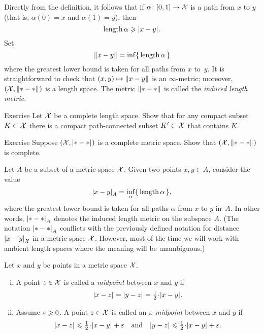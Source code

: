 Directly from the definition, it follows that if $\alpha\colon[0,1]\to\mathcal{X}$ is a path from $x$ to $y$ 
(that is, $\alpha(0)=x$ and $\alpha(1)=y$), then 
\[\length\alpha\ge \dist{x}{y}{}.\]
Set 
\[\yetdist{x}{y}{}=\inf\{\,\length\alpha\,\}\]
where the greatest lower bound is taken for all paths from $x$ to~$y$.
It is straightforward to check that $(x,y)\mapsto \yetdist{x}{y}{}$ is an $\infty$-metric; moreover, $(\spc{X},\yetdist{*}{*}{})$ is a length space.
The metric $\yetdist{*}{*}{}$ is called the \emph{induced length metric}.

\begin{thm}{Exercise}\label{ex:compact+connceted}
Let $\mathcal{X}$ be a complete length space.
Show that for any compact subset $K\subset\mathcal{X}$
there is a compact path-connected subset $K'\subset\mathcal{X}$ that contains $K$.  
\end{thm}

\begin{thm}{Exercise}\label{ex:compact=>complete}
Suppose $(\spc{X},\dist{*}{*}{})$ is a complete metric space.
Show that $(\spc{X},\yetdist{*}{*}{})$ is complete.
\end{thm}

Let $A$ be a subset of a metric space $\mathcal{X}$.
Given two points $x,y\in A$,
consider the value
\[\dist{x}{y}{A}=\inf_{\alpha}\{\,\length\alpha\,\},\]
where the greatest lower bound is taken for all paths $\alpha$ from $x$ to $y$ in~$A$.
In other words, $\dist{*}{*}{A}$ denotes the induced length metric on the subspace $A$.
(The notation $\dist{*}{*}{A}$ conflicts with the previously defined notation for distance $\dist{x}{y}{\spc{X}}$ in a metric space $\mathcal{X}$.
However, most of the time we will work with ambient length spaces where the meaning will be unambiguous.)

Let $x$ and $y$ be points in a metric space $\mathcal{X}$.

\begin{enumerate}[(i)]
\item A point $z\in \mathcal{X}$ is called a \emph{midpoint} between $x$ and $y$
if 
\[\dist{x}{z}{}=\dist{y}{z}{}=\tfrac12\cdot\dist[{{}}]{x}{y}{}.\]
\item Assume $\varepsilon\geqslant 0$.
A point $z\in \mathcal{X}$ is called an \emph{$\varepsilon$-midpoint} between $x$ and $y$
if 
\[\dist{x}{z}{}\le\tfrac12\cdot\dist[{{}}]{x}{y}{}+\eps
\quad\text{and}\quad
\dist{y}{z}{}\le\tfrac12\cdot\dist[{{}}]{x}{y}{}+\eps.\]
\end{enumerate}


